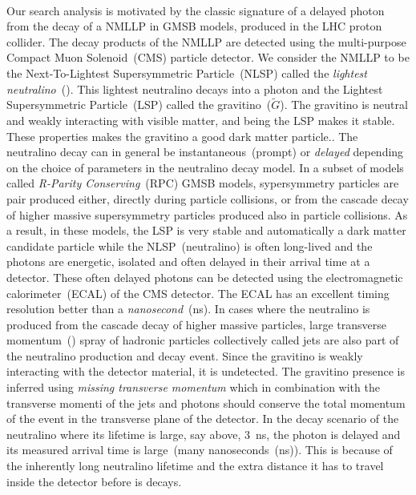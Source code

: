 \paragraph*{}%
Our search analysis is motivated by the classic signature of a delayed photon from the decay of a NMLLP in GMSB models, produced in the LHC proton collider. The decay products of the NMLLP are detected using the multi-purpose Compact Muon Solenoid~(CMS) particle detector. We consider the NMLLP to be the Next-To-Lightest Supersymmetric Particle~(NLSP) called the \textit{lightest neutralino}~(\PSneutralinoOne). This lightest neutralino decays into a photon and the Lightest Supersymmetric Particle~(LSP) called the gravitino~($\tilde{G}$).  The gravitino is neutral and weakly interacting with visible matter, and being the LSP makes it stable. These properties makes the gravitino a good dark matter particle.. The neutralino decay can in general be instantaneous~(prompt) or \textit{delayed} depending on the choice of parameters in the neutralino decay model. In a subset of models called \textit{R-Parity Conserving}~(RPC) GMSB models, sypersymmetry particles are pair produced either, directly during particle collisions, or from the cascade decay of higher massive supersymmetry particles produced also in particle collisions. As a result, in these models, the LSP is very stable and automatically a dark matter candidate particle while the NLSP~(neutralino) is often long-lived and the photons are energetic, isolated and often delayed in their arrival time at a detector. These often delayed photons can be detected using the electromagnetic calorimeter~(ECAL) of the CMS detector.
The ECAL has an excellent timing resolution better than a \textit{nanosecond}~(ns). In cases where the neutralino is produced from the cascade decay of higher massive particles, large transverse momentum~(\pt) spray of hadronic particles collectively called jets are also part of the neutralino production and decay event. Since the gravitino is weakly interacting with the detector material, it is undetected. The gravitino presence is inferred using \textit{missing transverse momentum} which in combination with the transverse momenti of the jets and photons should conserve the total momentum of the event in the transverse plane of the detector.
In the decay scenario of the neutralino where its lifetime is large, say above, $3$~ns, the photon is delayed and its measured arrival time is large~(many nanoseconds~(ns)). This is because of the inherently long neutralino lifetime and the extra distance it has to travel inside the detector before is decays. 
